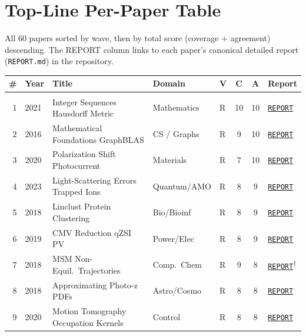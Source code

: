 \clearpage
\section{Top-Line Per-Paper Table}\label{sec:topline}

All 60 papers sorted by wave, then by total score (coverage + agreement)
descending. The REPORT column links to each paper's canonical detailed
report (\texttt{REPORT.md}) in the repository.

\newcommand{\rpt}[1]{\href{#1}{\texttt{REPORT}}}
\newcommand{\norpt}{\textit{(none)}}

{\small
\begin{longtable}{rlp{4.0cm}p{2.3cm}lccp{3.2cm}}
\toprule
\# & Year & Title & Domain & V & C & A & Report \\\midrule
\endhead
\bottomrule
\endfoot
\multicolumn{8}{l}{\textbf{Wave 1} (30 papers, 2026-04 early)} \\[3pt]
1 & 2021 & Integer Sequences Hausdorff Metric & Mathematics & R & 10 & 10 & \rpt{1997354-Integer-Sequences-from-Configurations-in-the/REPORT.md} \\
2 & 2016 & Mathematical Foundations GraphBLAS & CS / Graphs & R & 9 & 10 & \rpt{1379592-Mathematical-Foundations-of-the-GraphBLAS/REPORT.md} \\
3 & 2020 & Polarization Shift Photocurrent & Materials & R & 7 & 10 & \rpt{1523841-Quantitative-relationship-between-polarization-differences-a/REPORT.md} \\
4 & 2023 & Light-Scattering Errors Trapped Ions & Quantum/AMO & R & 8 & 9 & \rpt{2441075-Exactly-solved-model-of-light-scattering-errors-in/REPORT.md} \\
5 & 2018 & Linclust Protein Clustering & Bio/Bioinf & R & 8 & 9 & \rpt{1624105-Clustering-huge-protein-sequence-sets-in/REPORT.md} \\
6 & 2019 & CMV Reduction qZSI PV & Power/Elec & R & 8 & 9 & \rpt{1606674-Common-Mode-Voltage-Reduction-of-Single-Phase/REPORT.md} \\
7 & 2018 & MSM Non-Equil.\ Trajectories & Comp.\ Chem & R & 9 & 8 & \rpt{1565592-Markov-state-models-from-short-non-equilibrium/replication/replication\_report.md}\textsuperscript{$\dagger$} \\
8 & 2018 & Approximating Photo-z PDFs & Astro/Cosmo & R & 8 & 8 & \rpt{1461824-APPROXIMATING-PHOTO-Z-PDFS-FOR-LARGE-SURVEYS/REPORT.md} \\
9 & 2020 & Motion Tomography Occupation Kernels & Control & R & 8 & 8 & \rpt{1842593-MOTION-TOMOGRAPHY-VIA-OCCUPATION-KERNELS/REPORT.md} \\

\end{longtable}}
